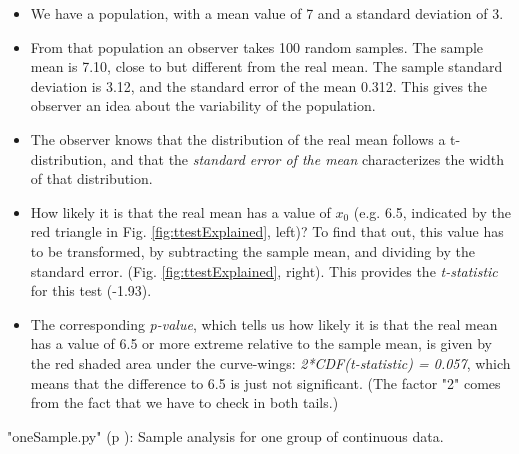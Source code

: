 \begin{itemize}
  \item We have a population, with a mean value of 7 and a standard deviation of 3.
  \item From that population an observer takes 100 random samples. The sample mean is 7.10, close to but different from the real mean. The sample standard deviation is 3.12, and the standard error of the mean 0.312. This gives the observer an idea about the variability of the population.
  \item The observer knows that the distribution of the real mean follows a t-distribution, and that the \emph{standard error of the mean} characterizes the width of that distribution.
  \item How likely it is that the real mean has a value of $x_0$ (e.g. 6.5, indicated by the red triangle in Fig. \ref{fig:ttestExplained}, left)? To find that out, this value has to be transformed, by subtracting the sample mean, and dividing by the standard error. (Fig. \ref{fig:ttestExplained}, right). This provides the \emph{t-statistic} for this test (-1.93).
  \item The corresponding \emph{p-value}, which tells us how likely it is that the real mean has a value of 6.5 or more extreme relative to the sample mean, is given by the red shaded area under the curve-wings: \emph{2*CDF(t-statistic) = 0.057}, which means that the difference to 6.5 is just not significant. (The factor "2" comes from the fact that we have to check in both tails.)
\end{itemize}

\PyImg "oneSample.py" (p \pageref{py:oneSample}): Sample analysis for one group of continuous data.

%
%


